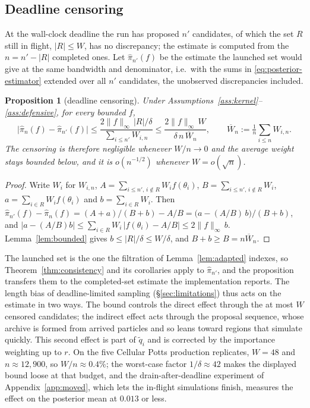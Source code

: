 \documentclass[10pt]{article}
\theoremstyle{plain}
\newtheorem{proposition}[theorem]{Proposition}
\theoremstyle{definition}
\begin{document}
\subsection{Deadline censoring}\label{app:theory-censoring}
At the wall-clock deadline the run has proposed $n'$ candidates, of which the set $R$ still in flight, $|R|\le W$, has no discrepancy; the estimate is computed from the $n=n'-|R|$ completed ones. Let $\widehat\pi_{n'}(f)$ be the estimate the launched set would give at the same bandwidth and denominator, i.e.\ with the sums in \eqref{eq:posterior-estimator} extended over all $n'$ candidates, the unobserved discrepancies included.
\begin{proposition}[deadline censoring]\label{prop:censoring}
Under Assumptions~\ref{ass:kernel}--\ref{ass:defensive}, for every bounded $f$,
\[
\bigl|\widehat\pi_n(f)-\widehat\pi_{n'}(f)\bigr|
\le\frac{2\|f\|_\infty\,|R|/\delta}{\sum_{i\le n'}W_{i,n}}
\le\frac{2\|f\|_\infty\,W}{\delta\,n\,\overline W_n},
\qquad \overline W_n:=\tfrac1n\textstyle\sum_{i\le n}W_{i,n} .
\]
The censoring is therefore negligible whenever $W/n\to0$ and the average weight stays bounded below, and it is $o(n^{-1/2})$ whenever $W=o(\sqrt n)$.
\end{proposition}
\begin{proof}
Write $W_i$ for $W_{i,n}$, $A=\sum_{i\le n',\,i\notin R}W_if(\theta_i)$, $B=\sum_{i\le n',\,i\notin R}W_i$, $a=\sum_{i\in R}W_if(\theta_i)$ and $b=\sum_{i\in R}W_i$. Then $\widehat\pi_{n'}(f)-\widehat\pi_n(f)=(A+a)/(B+b)-A/B=\bigl(a-(A/B)\,b\bigr)/(B+b)$, and $|a-(A/B)b|\le\sum_{i\in R}W_i\,|f(\theta_i)-A/B|\le2\|f\|_\infty\,b$. Lemma~\ref{lem:bounded} gives $b\le|R|/\delta\le W/\delta$, and $B+b\ge B=n\overline W_n$.
\end{proof}
The launched set is the one the filtration of Lemma~\ref{lem:adapted} indexes, so Theorem~\ref{thm:consistency} and its corollaries apply to $\widehat\pi_{n'}$, and the proposition transfers them to the completed-set estimate the implementation reports. The length bias of deadline-limited sampling (\S\ref{sec:limitations}) thus acts on the estimate in two ways. The bound controls the direct effect through the at most $W$ censored candidates; the indirect effect acts through the proposal sequence, whose archive is formed from arrived particles and so leans toward regions that simulate quickly. This second effect is part of $\tilde q_i$ and is corrected by the importance weighting up to $r$. On the five Cellular Potts production replicates, $W=48$ and $n\approx12{,}900$, so $W/n\approx0.4\%$; the worst-case factor $1/\delta\approx42$ makes the displayed bound loose at that budget, and the drain-after-deadline experiment of Appendix~\ref{app:moved}, which lets the in-flight simulations finish, measures the effect on the posterior mean at $0.013$ or less.
\end{document}
